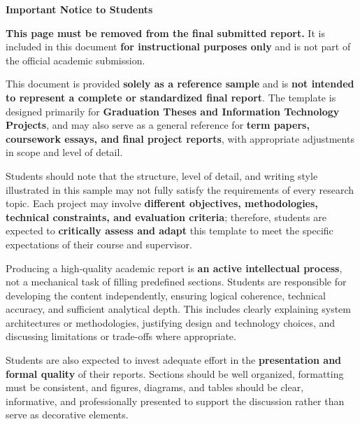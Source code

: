 \begin{center}
    \textbf{\Large Important Notice to Students}
\end{center}

\vspace{0.5em}

\small

\textbf{This page must be removed from the final submitted report.}  
It is included in this document \textbf{for instructional purposes only} and is not part of the official academic submission.

\vspace{0.6em}

This document is provided \textbf{solely as a reference sample} and is \textbf{not intended to represent a complete or standardized final report}. The template is designed primarily for \textbf{Graduation Theses and Information Technology Projects}, and may also serve as a general reference for \textbf{term papers, coursework essays, and final project reports}, with appropriate adjustments in scope and level of detail.

\vspace{0.6em}

Students should note that the structure, level of detail, and writing style illustrated in this sample may not fully satisfy the requirements of every research topic. Each project may involve \textbf{different objectives, methodologies, technical constraints, and evaluation criteria}; therefore, students are expected to \textbf{critically assess and adapt} this template to meet the specific expectations of their course and supervisor.

\vspace{0.6em}

Producing a high-quality academic report is \textbf{an active intellectual process}, not a mechanical task of filling predefined sections. Students are responsible for developing the content independently, ensuring logical coherence, technical accuracy, and sufficient analytical depth. This includes clearly explaining system architectures or methodologies, justifying design and technology choices, and discussing limitations or trade-offs where appropriate.

\vspace{0.6em}

Students are also expected to invest adequate effort in the \textbf{presentation and formal quality} of their reports. Sections should be well organized, formatting must be consistent, and figures, diagrams, and tables should be clear, informative, and professionally presented to support the discussion rather than serve as decorative elements.

